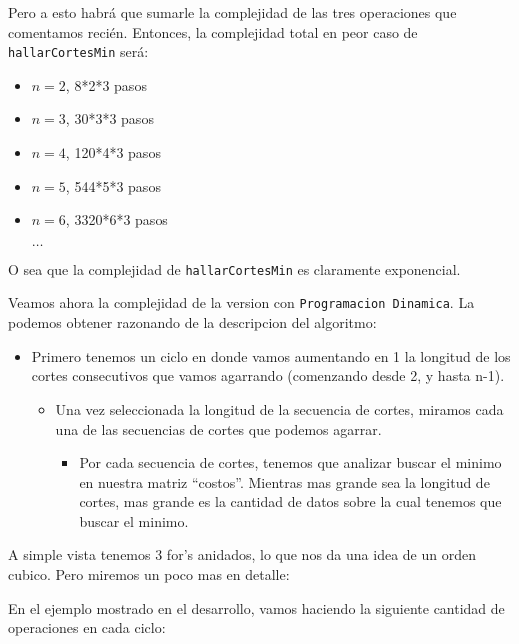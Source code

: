 \documentclass[12pt, a4paper,english,spanish]{article}
\begin{document}
Pero a esto habr\'a que sumarle la complejidad de las tres operaciones que comentamos reci\'en. Entonces, la complejidad total en peor caso de \texttt{hallarCortesMin} ser\'a:

\begin{itemize}
\item $n=2$, 8*2*3 pasos 
\item $n=3$, 30*3*3 pasos 
\item $n=4$, 120*4*3 pasos
\item $n=5$, 544*5*3 pasos
\item $n=6$, 3320*6*3 pasos

$\ldots$
\end{itemize}

O sea que la complejidad de \texttt{hallarCortesMin} es claramente exponencial.

\vspace{0.8cm}

 Veamos ahora la complejidad de la version con  \texttt{Programacion Dinamica}. La podemos obtener razonando de la descripcion del algoritmo:

\begin{itemize}
\item Primero tenemos un ciclo en donde vamos aumentando en 1 la longitud de los cortes consecutivos que vamos agarrando (comenzando desde 2, y hasta n-1).
\begin{itemize}
\item Una vez seleccionada la longitud de la secuencia de cortes, miramos cada una de las secuencias de cortes que podemos agarrar.
\begin{itemize}
\item Por cada secuencia de cortes, tenemos que analizar buscar el minimo en nuestra matriz ``costos''. Mientras mas grande sea la longitud de cortes, mas grande es la cantidad de datos sobre la cual tenemos que buscar el minimo.
\end{itemize}
\end{itemize}
\end{itemize}

A simple vista tenemos 3 for's anidados, lo que nos da una idea de un orden cubico. Pero miremos un poco mas en detalle:

\vspace{0.5cm}

En el ejemplo mostrado en el desarrollo, vamos haciendo la siguiente cantidad de operaciones en cada ciclo:

\vspace{0.5cm}
\end{document}

